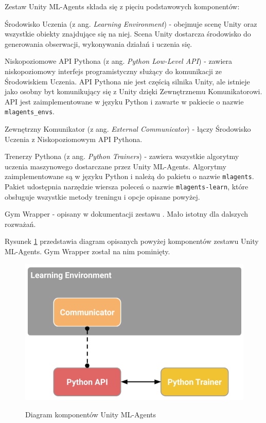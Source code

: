 Zestaw Unity ML-Agents składa się z pięciu podstawowych komponentów:
\begin{enumerate*}
\item Środowisko Uczenia (z ang. \textit{Learning Environment}) - obejmuje scenę Unity oraz wszystkie obiekty znajdujące się na niej. Scena Unity dostarcza środowisko do generowania obserwacji, wykonywania działań i uczenia się.
\item Niskopoziomowe API Pythona (z ang. \textit{Python Low-Level API}) \cite{unitymla:pythonapi} - zawiera niskopoziomowy interfejs programistyczny służący do komunikacji ze Środowiskiem Uczenia. API Pythona nie jest częścią silnika Unity, ale istnieje jako osobny byt komunikujący się z Unity dzięki Zewnętrznemu Komunikatorowi. API jest zaimplementowane w języku Python i zawarte w pakiecie o nazwie \texttt{mlagents\_envs}.
\item Zewnętrzny Komunikator (z ang. \textit{External Communicator}) - łączy Środowisko Uczenia z Niskopoziomowym API Pythona.
\item Trenerzy Pythona (z ang. \textit{Python Trainers}) - zawiera wszystkie algorytmy uczenia maszynowego dostarczane przez Unity ML-Agents. Algorytmy zaimplementowane są w języku Python i należą do pakietu o nazwie \texttt{mlagents}. Pakiet udostępnia narzędzie wiersza poleceń o nazwie \texttt{mlagents-learn}, które obsługuje wszystkie metody treningu i opcje opisane powyżej.
\item Gym Wrapper - opisany w dokumentacji zestawu \cite{unitymla:gymWrapper}. Mało istotny dla dalszych rozważań.
\end{enumerate*}

Rysunek \ref{UnityMlaComponents} przedstawia diagram opisanych powyżej komponentów zestawu Unity ML-Agents. Gym Wrapper został na nim pominięty.

\begin{figure}[h]
\begin{center}
\includegraphics[width=15cm]{resources/figures/learning_environment_basic.png}
\caption{Diagram komponentów Unity ML-Agents}
\label{UnityMlaComponents}
\end{center}
\end{figure}

